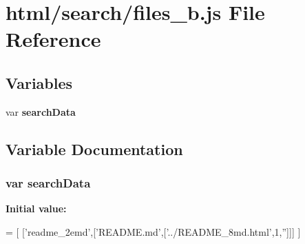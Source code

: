 \section{html/search/files\-\_\-b.js File Reference}
\label{files__b_8js}
\subsection*{Variables}
\begin{DoxyCompactItemize}
\item 
var {\bf search\-Data}
\end{DoxyCompactItemize}


\subsection{Variable Documentation}
\subsubsection[{search\-Data}]{\setlength{\rightskip}{0pt plus 5cm}var search\-Data}\label{files__b_8js_ad01a7523f103d6242ef9b0451861231e}
{\bfseries Initial value\-:}
\begin{DoxyCode}
=
[
  [\textcolor{stringliteral}{'readme\_2emd'},[\textcolor{stringliteral}{'README.md'},[\textcolor{stringliteral}{'../README\_8md.html'},1,\textcolor{stringliteral}{''}]]]
]
\end{DoxyCode}
